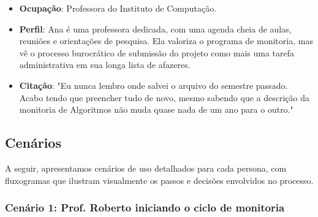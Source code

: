 \documentclass[12pt, a4paper]{report}
\begin{document}
\begin{center}
\end{center}

\vspace{0.5cm}

\begin{itemize}
    \item \textbf{Ocupação}: Professora do Instituto de Computação.
    \item \textbf{Perfil}: Ana é uma professora dedicada, com uma agenda cheia de aulas, reuniões e orientações de pesquisa. Ela valoriza o programa de monitoria, mas vê o processo burocrático de submissão do projeto como mais uma tarefa administrativa em sua longa lista de afazeres.
    \item \textbf{Citação}: "Eu nunca lembro onde salvei o arquivo do semestre passado. Acabo tendo que preencher tudo de novo, mesmo sabendo que a descrição da monitoria de Algoritmos não muda quase nada de um ano para o outro."
\end{itemize}

\subsection{Cenários}

A seguir, apresentamos cenários de uso detalhados para cada persona, com fluxogramas que ilustram visualmente os passos e decisões envolvidos no processo.

\subsubsection{Cenário 1: Prof. Roberto iniciando o ciclo de monitoria}
\end{document}
